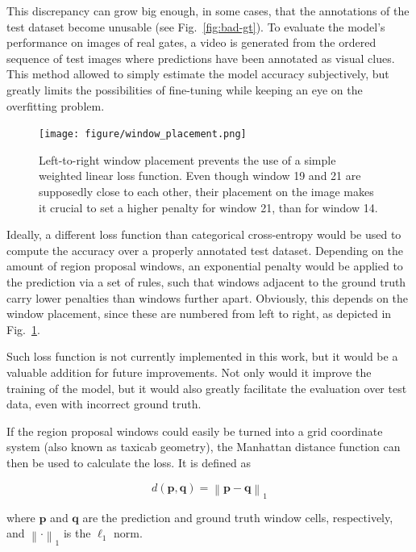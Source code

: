 This discrepancy can grow big enough, in some cases, that the annotations of
the test dataset become unusable (see Fig.~\ref{fig:bad-gt}). To evaluate the
model's performance on images of real gates, a video is generated from the
ordered sequence of test images where predictions have been annotated as visual
clues. This method allowed to simply estimate the model accuracy subjectively,
but greatly limits the possibilities of fine-tuning while keeping an eye on the
overfitting problem.\\

\begin{figure}[h]
	\centering
	\texttt{[image: figure/window\_placement.png]}
	\caption[Window placement and the need for a custom loss function]
		{Left-to-right window placement prevents the use of a simple
		weighted linear loss function. Even though window 19 and 21 are
		supposedly close to each other, their placement on the image makes it
		crucial to set a higher penalty for window 21, than for window 14.}
	\label{fig:window-placement}
\end{figure}

Ideally, a different loss function than categorical cross-entropy would be used
to compute the accuracy over a properly annotated test dataset. Depending on
the amount of region proposal windows, an exponential penalty would be applied
to the prediction via a set of rules, such that windows adjacent to the ground
truth carry lower penalties than windows further apart. Obviously, this depends
on the window placement, since these are numbered from left to right, as
depicted in Fig.~\ref{fig:window-placement}.

Such loss function is not currently implemented in this work, but it would be a
valuable addition for future improvements. Not only would it improve the
training of the model, but it would also greatly facilitate the evaluation over
test data, even with incorrect ground truth.

If the region proposal windows could easily be turned into a grid coordinate
system (also known as taxicab geometry), the Manhattan distance function can
then be used to calculate the loss. It is defined as

\begin{equation}
	d(\mathbf{p}, \mathbf{q}) = \left \|\mathbf{p}-\mathbf{q} \right \|_1
\end{equation}

where $\mathbf{p}$ and $\mathbf{q}$ are the prediction and ground truth window
cells, respectively, and $\left \| \cdot \right \|_1$ is the $\ell_1$ norm.
